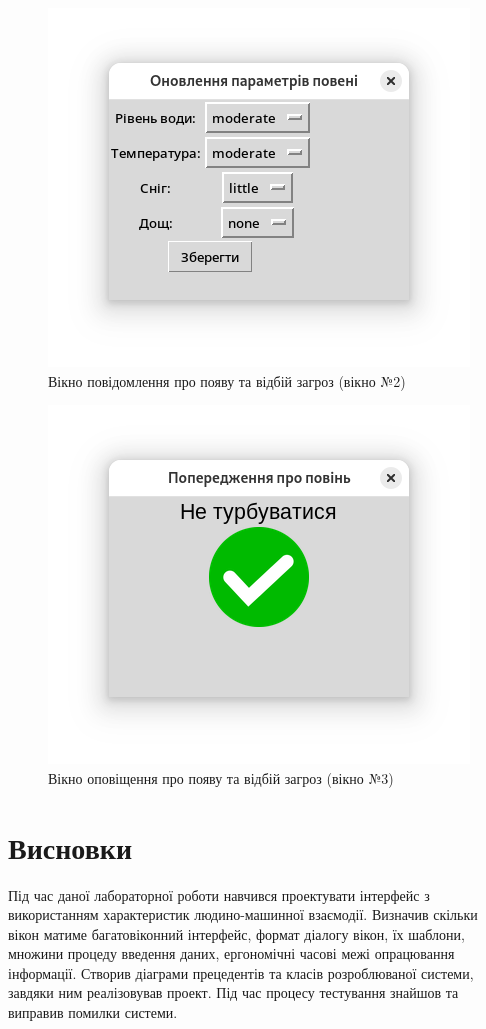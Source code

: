 \documentclass[14pt]{extreport}
\begin{document}
\begin{normalsize}
	\begin{figure}[H]
	  \centering
	  \includegraphics[scale=0.8]{2}
	  \caption{Вікно повідомлення про появу та відбій загроз (вікно №2)}
	\end{figure}
	
	\begin{figure}[H]
	  \centering
	  \includegraphics[scale=0.8]{3}
	  \caption{Вікно оповіщення про появу та відбій загроз (вікно №3)}
	\end{figure}
	
	\section*{Висновки}
	
	Під час даної лабораторної роботи навчився проектувати інтерфейс з використанням характеристик людино-машинної взаємодії. Визначив скільки вікон матиме багатовіконний інтерфейс, формат діалогу вікон, їх шаблони, множини процеду введення даних, ергономічні часові межі опрацювання інформації. Створив діаграми прецедентів та класів розроблюваної системи, завдяки ним реалізовував проект. Під час процесу тестування знайшов та виправив помилки системи.
	
	    
\end{normalsize}
\end{document}
